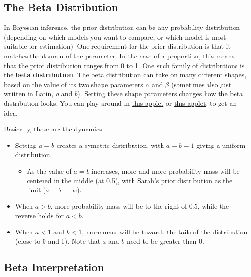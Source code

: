 \documentclass[
]{book}
\providecommand{\tightlist}{%
  \setlength{\itemsep}{0pt}\setlength{\parskip}{0pt}}
\begin{document}
\hypertarget{the-beta-distribution}{%
\subsection{The Beta Distribution}\label{the-beta-distribution}}

In Bayesian inference, the prior distribution can be any probability distribution (depending on which models you want to compare, or which model is most suitable for estimation). One requirement for the prior distribution is that it matches the domain of the parameter. In the case of a proportion, this means that the prior distribution ranges from 0 to 1. One such family of distributions is the \href{https://en.wikipedia.org/wiki/Beta_distribution}{\textbf{beta distribution}}. The beta distribution can take on many different shapes, based on the value of its two shape parameters \(\alpha\) and \(\beta\) (sometimes also just written in Latin, \emph{a} and \emph{b}). Setting these shape parameters changes how the beta distribution looks. You can play around in \href{https://researchmethodsuva.shinyapps.io/BayesTestMini/}{this applet} or \href{https://homepage.divms.uiowa.edu/~mbognar/applets/beta.html}{this applet}, to get an idea.

Basically, these are the dynamics:

\begin{itemize}
\tightlist
\item
  Setting \(a = b\) creates a symetric distribution, with \(a = b = 1\) giving a uniform distribution.

  \begin{itemize}
  \tightlist
  \item
    As the value of \(a = b\) increases, more and more probability mass will be centered in the middle (at 0.5), with Sarah's prior distribution as the limit (\(a = b = \infty\)).
  \end{itemize}
\item
  When \(a > b\), more probability mass will be to the right of 0.5, while the reverse holds for \(a < b\).
\item
  When \(a < 1\) and \(b < 1\), more mass will be towards the tails of the distribution (close to 0 and 1). Note that \(a\) and \(b\) need to be greater than 0.
\end{itemize}

\hypertarget{beta-interpretation-updating-section}{%
\subsection{Beta Interpretation}\label{beta-interpretation-updating-section}}
\end{document}
